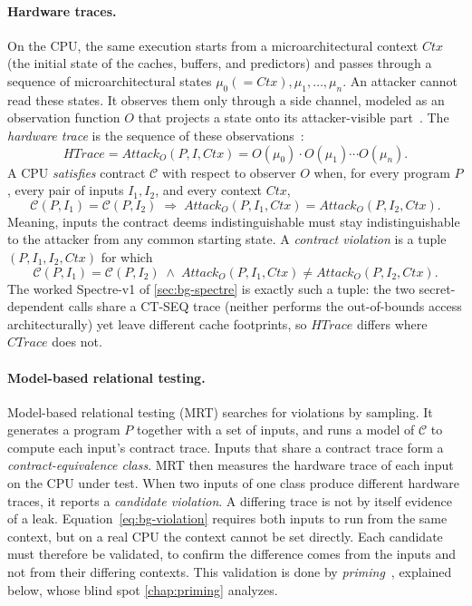 \paragraph{Hardware traces.}
On the CPU, the same execution starts from a microarchitectural context $\mathit{Ctx}$ (the
initial state of the caches, buffers, and predictors) and passes through a sequence of
microarchitectural states $\mu_0(=\mathit{Ctx}),\mu_1,\dots,\mu_n$. An attacker cannot read these
states. It observes them only through a side channel, modeled as an observation function $O$ that
projects a state onto its attacker-visible part~\cite{contracts}. The \emph{hardware trace} is the
sequence of these observations~\cite{revizor}:
\begin{equation}
\mathit{HTrace}=\mathit{Attack}_O(P,I,\mathit{Ctx}) = O(\mu_0)\cdot O(\mu_1)\cdots O(\mu_n).
\label{eq:bg-htrace}
\end{equation}
A CPU \emph{satisfies} contract $\mathcal{C}$ with respect to observer $O$ when, for every program
$P$, every pair of inputs $I_1,I_2$, and every context $\mathit{Ctx}$,
\begin{equation}
\mathcal{C}(P,I_1) = \mathcal{C}(P,I_2) \;\Longrightarrow\;
\mathit{Attack}_O(P,I_1,\mathit{Ctx}) = \mathit{Attack}_O(P,I_2,\mathit{Ctx}).
\label{eq:bg-contract}
\end{equation}
Meaning, inputs the contract deems indistinguishable must stay indistinguishable to the attacker from any
common starting state. A \emph{contract violation} is a tuple $(P,I_1,I_2,\mathit{Ctx})$ for which
\begin{equation}
\mathcal{C}(P,I_1) = \mathcal{C}(P,I_2) \;\land\;
\mathit{Attack}_O(P,I_1,\mathit{Ctx}) \neq \mathit{Attack}_O(P,I_2,\mathit{Ctx}).
\label{eq:bg-violation}
\end{equation}
The worked Spectre-v1 of \autoref{sec:bg-spectre} is exactly such a tuple: the two secret-%
dependent calls share a \textsc{CT-SEQ} trace (neither performs the out-of-bounds access
architecturally) yet leave different cache footprints, so $\mathit{HTrace}$ differs where
$\mathit{CTrace}$ does not.

\paragraph{Model-based relational testing.}
Model-based relational testing (MRT) searches for violations by sampling. It generates a program
$P$ together with a set of inputs, and runs a model of $\mathcal{C}$ to compute each input's
contract trace. Inputs that share a contract trace form a \emph{contract-equivalence class}. MRT
then measures the hardware trace of each input on the CPU under test. When two inputs of one class
produce different hardware traces, it reports a \emph{candidate violation}. A differing trace is not
by itself evidence of a leak. Equation~\eqref{eq:bg-violation} requires both inputs to run from the
same context, but on a real CPU the context cannot be set directly. Each candidate must therefore be
validated, to confirm the difference comes from the inputs and not from their differing contexts.
This validation is done by \emph{priming}~\cite{revizor}, explained below, whose blind spot
\autoref{chap:priming} analyzes.

